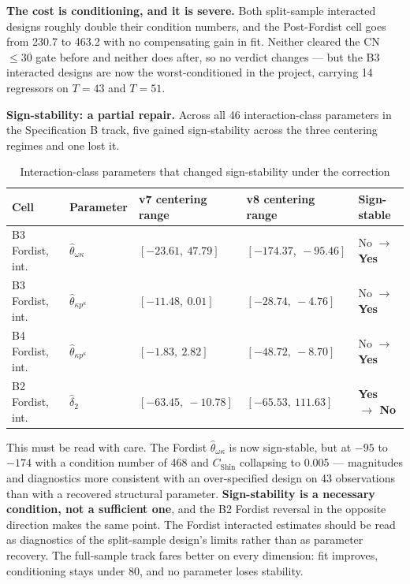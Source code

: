 \documentclass[11pt,a4paper]{article}
\begin{document}
\textbf{The cost is conditioning, and it is severe.} Both split-sample interacted designs roughly double their condition numbers, and the Post-Fordist cell goes from 230.7 to 463.2 with no compensating gain in fit. Neither cleared the CN $\le 30$ gate before and neither does after, so no verdict changes --- but the B3 interacted designs are now the worst-conditioned in the project, carrying 14 regressors on $T = 43$ and $T = 51$.

\textbf{Sign-stability: a partial repair.} Across all 46 interaction-class parameters in the Specification B track, five gained sign-stability across the three centering regimes and one lost it.

\begin{table}[H]
\centering
\caption{Interaction-class parameters that changed sign-stability under the correction}
\label{tab:specB_span_stability}
\small
\begin{tabular}{p{2.9cm}p{2.4cm}p{3.2cm}p{3.2cm}p{2.4cm}}
\toprule
Cell & Parameter & v7 centering range & v8 centering range & Sign-stable \\
\midrule
B3 Fordist, int. & $\hat{\theta}_{\omega\kappa}$ & $[-23.61,\ 47.79]$ & $[-174.37,\ -95.46]$ & No $\to$ \textbf{Yes} \\
B3 Fordist, int. & $\hat{\theta}_{\kappa p^{\kappa}}$ & $[-11.48,\ 0.01]$ & $[-28.74,\ -4.76]$ & No $\to$ \textbf{Yes} \\
B4 Fordist, int. & $\hat{\theta}_{\kappa p^{\kappa}}$ & $[-1.83,\ 2.82]$ & $[-48.72,\ -8.70]$ & No $\to$ \textbf{Yes} \\
B2 Fordist, int. & $\hat{\delta}_2$ & $[-63.45,\ -10.78]$ & $[-65.53,\ 111.63]$ & \textbf{Yes $\to$ No} \\
\bottomrule
\end{tabular}
\end{table}

This must be read with care. The Fordist $\hat{\theta}_{\omega\kappa}$ is now sign-stable, but at $-95$ to $-174$ with a condition number of 468 and $C_{\text{Shin}}$ collapsing to 0.005 --- magnitudes and diagnostics more consistent with an over-specified design on 43 observations than with a recovered structural parameter. \textbf{Sign-stability is a necessary condition, not a sufficient one}, and the B2 Fordist reversal in the opposite direction makes the same point. The Fordist interacted estimates should be read as diagnostics of the split-sample design's limits rather than as parameter recovery. The full-sample track fares better on every dimension: fit improves, conditioning stays under 80, and no parameter loses stability.
\end{document}
